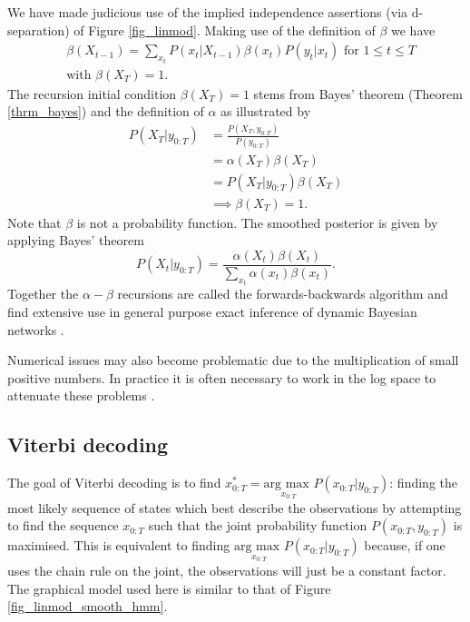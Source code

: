 We have made judicious use of the implied independence assertions (via d-separation) of Figure \ref{fig_linmod}. Making use of the definition of $\beta$ we have
\begin{equation}
\begin{aligned}
&\beta(X_{t-1}) = \sum_{x_t} P(x_t | X_{t-1})\beta(x_t)P(y_t| x_t) \text{ for } 1 \leq t \leq T \\
&\text{with } \beta(X_T) = 1.
\end{aligned}
\label{eq_backwards_recur}
\end{equation}
The recursion initial condition $\beta(X_T) = 1$ stems from Bayes' theorem (Theorem \ref{thrm_bayes}) and the definition of $\alpha$ as illustrated by
\begin{equation}
\begin{aligned}
P(X_T|y_{0:T}) &= \frac{P(X_T, y_{0:T})}{P(y_{0:T})} \\
&= \alpha(X_T) \beta(X_T)\\
&= P(X_T| y_{0:T}) \beta(X_T)\\
&\implies \beta(X_T) = 1.
\end{aligned}
\label{eq_backwards_recur_initial}
\end{equation}
Note that $\beta$ is not a probability function. The smoothed posterior is given by applying Bayes' theorem
\begin{equation}
P(X_t|y_{0:T}) = \frac{\alpha(X_t)\beta(X_t)}{\sum_{x_t}\alpha(x_t)\beta(x_t)}.
\label{eq_smooth}
\end{equation}
Together the $\alpha - \beta$ recursions are called the forwards-backwards algorithm and find extensive use in general purpose exact inference of dynamic Bayesian networks \cite{murphy1}.

Numerical issues may also become problematic due to the multiplication of small positive numbers. In practice it is often necessary to work in the log space to attenuate these problems \cite{barber}. 

\subsection{Viterbi decoding}
The goal of Viterbi decoding is to find $x_{0:T}^* = \underset{x_{0:T}}{\text{arg max }} P(x_{0:T}|y_{0:T})$: finding the most likely sequence of states which best describe the observations by  attempting to find the sequence $x_{0:T}$ such that the joint probability function $P(x_{0:T}, y_{0:T})$ is maximised. This is equivalent to finding $ \underset{x_{0:T}}{\text{arg max }} P(x_{0:T}|y_{0:T})$ because, if one uses the chain rule on the joint, the observations will just be a constant factor. The graphical model used here is similar to that of Figure \ref{fig_linmod_smooth_hmm}.

